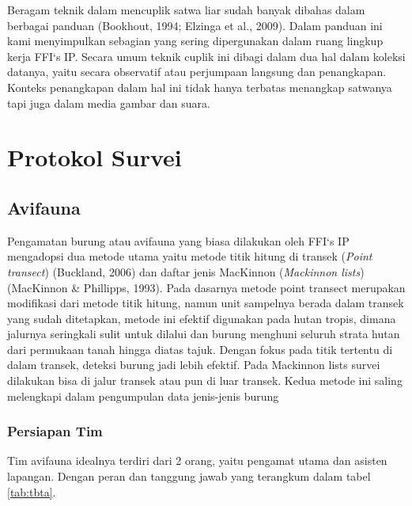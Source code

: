 \documentclass[
]{book}
\begin{document}
Beragam teknik dalam mencuplik satwa liar sudah banyak dibahas dalam berbagai panduan (Bookhout, 1994; Elzinga et al., 2009). Dalam panduan ini kami menyimpulkan sebagian yang sering dipergunakan dalam ruang lingkup kerja FFI`s IP. Secara umum teknik cuplik ini dibagi dalam dua hal dalam koleksi datanya, yaitu secara observatif atau perjumpaan langsung dan penangkapan. Konteks penangkapan dalam hal ini tidak hanya terbatas menangkap satwanya tapi juga dalam media gambar dan suara.

\hypertarget{protokol-survei}{%
\chapter*{Protokol Survei}\label{protokol-survei}}

\hypertarget{avifauna}{%
\section*{Avifauna}\label{avifauna}}

Pengamatan burung atau avifauna yang biasa dilakukan oleh FFI`s IP mengadopsi dua metode utama yaitu metode titik hitung di transek (\emph{Point transect}) (Buckland, 2006) dan daftar jenis MacKinnon (\emph{Mackinnon lists}) (MacKinnon \& Phillipps, 1993). Pada dasarnya metode point transect merupakan modifikasi dari metode titik hitung, namun unit sampelnya berada dalam transek yang sudah ditetapkan, metode ini efektif digunakan pada hutan tropis, dimana jalurnya seringkali sulit untuk dilalui dan burung menghuni seluruh strata hutan dari permukaan tanah hingga diatas tajuk. Dengan fokus pada titik tertentu di dalam transek, deteksi burung jadi lebih efektif. Pada Mackinnon lists survei dilakukan bisa di jalur transek atau pun di luar transek. Kedua metode ini saling melengkapi dalam pengumpulan data jenis-jenis burung

\hypertarget{persiapan-tim}{%
\subsection*{Persiapan Tim}\label{persiapan-tim}}

Tim avifauna idealnya terdiri dari 2 orang, yaitu pengamat utama dan asisten lapangan. Dengan peran dan tanggung jawab yang terangkum dalam tabel \ref{tab:tbta}.
\end{document}
